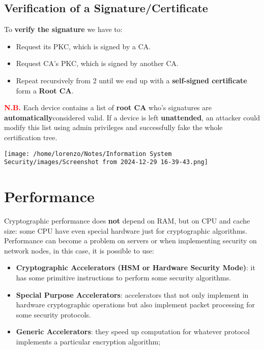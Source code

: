\subsection{Verification of a Signature/Certificate}
To \textbf{verify the signature} we have to:
\\
\begin{minipage}{0.6\textwidth}
\begin{itemize}
    \item Request its PKC, which is signed by a CA.
    \item Request CA's PKC, which is signed by another CA.
    \item Repeat recursively from 2 until we end up with a \textbf{self-signed certificate} form a \textbf{Root CA}.
\end{itemize}
\textcolor{red}{\textbf{N.B.}} Each device contains a list of \textbf{root CA} who’s signatures are \textbf{automatically}considered valid.
If a device is left \textbf{unattended}, an attacker could modify this list using admin privileges and
successfully fake the whole certification tree.
\end{minipage} 
\hspace{0.3cm}
\begin{minipage}{0.4\textwidth}
    \centering
    \texttt{[image: /home/lorenzo/Notes/Information System Security/images/Screenshot from 2024-12-29 16-39-43.png]}
\end{minipage}
\noindent{\color{gray!50}\rule{\textwidth}{0.5pt}}
\section{Performance}
Cryptographic performance does \textbf{not} depend on RAM, but on CPU and cache size: some CPU have even special hardware just for cryptographic algorithms. Performance can become a problem on servers or when implementing security on network nodes, in this case, it is possible to use:
\begin{itemize}
    \item \textbf{Cryptographic Accelerators (HSM or Hardware Security Mode)}: it has some primitive instructions to perform some security algorithms.
    \item \textbf{Special Purpose Accelerators}: accelerators that not only implement in hardware cryptographic operations but also implement packet processing for some security protocols.
    \item \textbf{Generic Accelerators}: they speed up computation for whatever protocol implements a particular encryption algorithm;
\end{itemize}
\newpage
